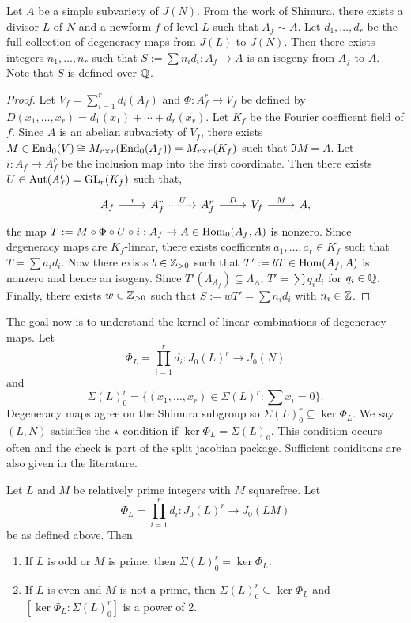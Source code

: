 \documentclass{article}
\begin{document}
\begin{proposition}
    \label{integral_degen}
    Let $A$ be a simple subvariety of $J(N)$. From the work of Shimura,
    there exists a divisor $L$ of $N$ and a newform $f$ of level $L$ such that
    $A_f \sim A$. Let $d_1,\ldots,d_r$ be the full collection of degeneracy
    maps from $J(L)$ to $J(N)$. Then there exists integers $n_1,\ldots,n_r$
    such that $S:=\sum n_i d_i: A_f\to A$ is an isogeny from $A_f$ to $A$. Note
    that $S$ is defined over $\mathbb{Q}$.
\end{proposition}
\begin{proof}
    Let $V_f=\sum_{i=1} ^r d_i(A_f)$ and $\Phi:A_f ^r \to V_f$ be defined by
    $D(x_1,\ldots,x_r) = d_1(x_1)+\cdots+d_r(x_r)$. Let $K_f$ be the Fourier
    coefficent field of $f$. Since $A$ is an abelian subvariety of $V_f$, there
    exists $M\in \operatorname{End}_0(V)\cong M_{r\times r} (\operatorname{End}_0(A_f)) = M_{r\times r}
    (K_f)$ such that $\Im M = A$. Let $i:A_f\to A_f ^r$ be the inclusion map
    into the first coordinate. Then there exists $U\in \operatorname{Aut}(A_f
    ^r)=\operatorname{GL}_r (K_f)$ such that,
    \[
        \begin{tikzcd}
            A_f \arrow[r,"i"] &
            A_f ^r \arrow[r, dotted, "U"] &
            A_f ^r \arrow[r, "D"] &
            V_f \arrow[r, "M"] &
            A,
        \end{tikzcd}
    \]
    the map $T:=M \circ \Phi \circ U\circ i:A_f\to A\in \operatorname{Hom}_0(A_f, A)$ is
    nonzero. Since degeneracy maps are $K_f$-linear, there exists coefficents
    $a_1,\ldots,a_r\in K_f$ such that $T = \sum a_i d_i$. Now there exists
    $b\in \mathbb{Z}_{>0}$ such that $T':=bT\in \operatorname{Hom}(A_f, A)$ is nonzero and hence an
    isogeny. Since $T'(\Lambda_{A_f})\subseteq \Lambda_A$, $T'=\sum q_i d_i$
    for $q_i\in \mathbb{Q}$. Finally, there exists $w\in \mathbb{Z}_{>0}$ such that
    $S:=wT'=\sum n_i d_i$ with $n_i\in \mathbb{Z}$.
\end{proof}

The goal now is to understand the kernel of linear combinations of degeneracy
maps. Let
\[
    \Phi_L = \prod_{i=1} ^r d_i : J_0(L)^r \to J_0(N)
\]
and
\[
    \Sigma(L)_0 ^r =\{(x_1,\ldots,x_r)\in \Sigma(L)^r: \sum x_i = 0\}.
\]
Degeneracy maps agree on the Shimura subgroup so $\Sigma(L)_0 ^r \subseteq
\ker\Phi_L$. We say $(L, N)$ satisifies the $\star$-condition if
$\ker\Phi_L=\Sigma(L)_0$. This condition occurs often and the check is part of
the split jacobian package. Sufficient coniditons are also given in the
literature.  
\begin{theorem}
    \label{ribet_ling}
    Let $L$ and $M$ be relatively prime integers with $M$ squarefree. Let
    \[
        \Phi_L = \prod_{i=1} ^r d_i  : J_0(L)^r \to J_0(LM)
    \]
    be as defined above. Then
    \begin{enumerate}
        \item 
            If $L$ is odd or $M$ is prime, then $\Sigma(L)_0 ^r=\ker\Phi_L$.
        \item
            If $L$ is even and $M$ is not a prime, then $\Sigma(L)_0 ^r
            \subseteq \ker\Phi_L$ and $[\ker\Phi_L: \Sigma(L)_0 ^r]$ is
            a power of 2.
    \end{enumerate}
\end{theorem}
\end{document}
